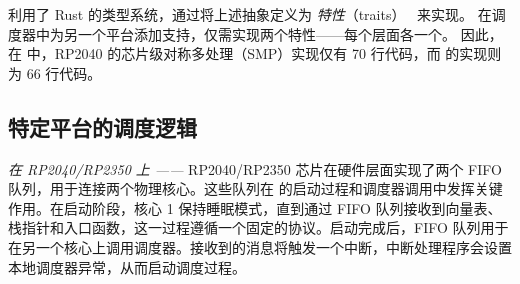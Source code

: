 \OSname{} 利用了 Rust 的类型系统，通过将上述抽象定义为 \emph{特性}（traits）~\cite{rust-book_traits} 来实现。
在调度器中为另一个平台添加支持，仅需实现两个特性——每个层面各一个。
因此，在 \OSname{} 中，RP2040 的芯片级对称多处理（SMP）实现仅有 70 行代码，而 \espsthree{} 的实现则为 66 行代码。

\subsection{特定平台的调度逻辑}

\noindent \textit{在 RP2040/RP2350 上 ——} RP2040/RP2350 芯片在硬件层面实现了两个 FIFO 队列，用于连接两个物理核心。这些队列在 \OSname{} 的启动过程和调度器调用中发挥关键作用。在启动阶段，核心 1 保持睡眠模式，直到通过 FIFO 队列接收到向量表、栈指针和入口函数，这一过程遵循一个固定的协议。启动完成后，FIFO 队列用于在另一个核心上调用调度器。接收到的消息将触发一个中断，中断处理程序会设置本地调度器异常，从而启动调度过程。

